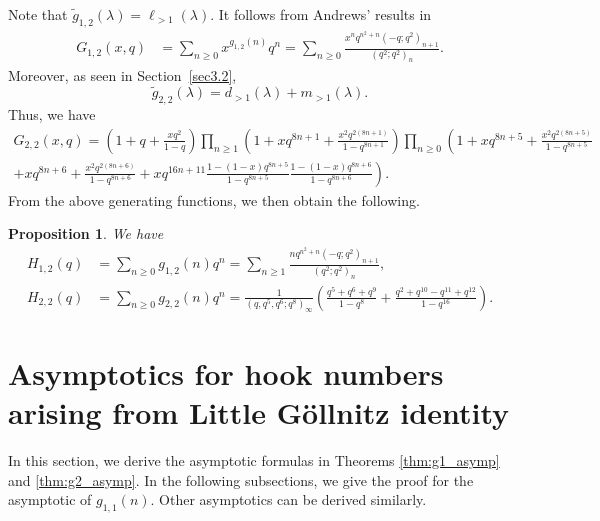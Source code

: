 \documentclass[11pt,reqno]{amsart}
\newtheorem{proposition}[theorem]{Proposition}
\theoremstyle{remark}
\numberwithin{equation}{section}
\begin{document}
Note that $\widetilde{g}_{1,2}(\lambda)=\ell_{>1}(\lambda)$. It follows from Andrews' results in \cite[Eqs. (2.19), (2.20)]{andrews_siam}
\begin{align*}
	G_{1,2}(x,q)&=\sum_{n\ge 0} x^{g_{1,2} (n) } q^{n}= \sum_{n\ge 0} \frac{ x^n q^{n^2+n} (-q;q^2)_{n+1}}{(q^2;q^2)_n}.
\end{align*}
Moreover, as seen in Section~\ref{sec3.2}, 
\begin{equation*}
\widetilde{g}_{2,2}(\lambda)=d_{>1}(\lambda)+m_{>1}(\lambda). 
\end{equation*}
Thus, we have
\begin{multline*}
	G_{2,2}(x,q)=\left(1+q+\frac{xq^2}{1-q}\right) \prod_{n\ge 1} \left(1+xq^{8n+1}+ \frac{x^2 q^{2(8n+1)}}{1-q^{8n+1}} \right)
	 \prod_{n\ge 0} \left( 1+ xq^{8n+5} +\frac{x^2 q^{2(8n+5)}}{1-q^{8n+5}} \right.\\ \left. + xq^{8n+6} +\frac{x^2 q^{2(8n+6)}}{1-q^{8n+6}}
    + x q^{16n+11} \frac{1-(1-x)q^{8n+5}}{1-q^{8n+5}} \frac{1-(1-x)q^{8n+6}}{1-q^{8n+6}}\right). 
\end{multline*}
From the above generating functions, we then obtain the following.
\begin{proposition}\label{gen_H2}
We have
\begin{align*}
	H_{1,2}(q)&=\sum_{n\ge 0} g_{1,2}(n) q^{n} = \sum_{n\ge 1} \frac{n q^{n^2+n}(-q;q^2)_{n+1}}{ (q^2;q^2)_n},\\
	H_{2,2}(q)&=\sum_{n\ge 0} g_{2,2}(n) q^{n} = \frac{1}{(q,q^5,q^6;q^8)_\infty}\left( \frac{q^5+q^6+q^9}{1-q^8} + \frac{q^2+q^{10}-q^{11}+q^{12}}{1-q^{16}} \right).
\end{align*}
\end{proposition}




 
 
\section{Asymptotics for hook numbers arising from Little G\"ollnitz identity}\label{sec6}
In this section, we derive the asymptotic formulas in Theorems \ref{thm:g1_asymp} and \ref{thm:g2_asymp}.
In the following subsections, we give the proof for the asymptotic of $g_{1,1}(n)$. Other asymptotics can be derived similarly.
\end{document}
